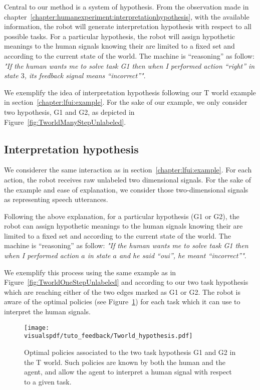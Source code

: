 Central to our method is a system of hypothesis. From the observation made in chapter~\ref{chapter:humanexperiment:interpretationhypothesis}, with the available information, the robot will generate interpretation hypothesis with respect to all possible tasks. For a particular hypothesis, the robot will assign hypothetic meanings to the human signals knowing their are limited to a fixed set and according to the current state of the world. The machine is ``reasoning'' as follow: \emph{"If the human wants me to solve task G1 then when I performed action ``right'' in state $3$, its feedback signal means ``incorrect''"}. 

We exemplify the idea of interpretation hypothesis following our T world example in section~\ref{chapter:lfui:example}. For the sake of our example, we only consider two hypothesis, G1 and G2, as depicted in Figure~\ref{fig:TworldManyStepUnlabeled}.

\subsection{Interpretation hypothesis}
\label{chapter:lfui:interpreation}

We considerer the same interaction as in section~\ref{chapter:lfui:example}. For each action, the robot receives raw unlabeled two dimensional signals. For the sake of the example and ease of explanation, we consider those two-dimensional signals as representing speech utterances.

Following the above explanation, for a particular hypothesis (G1 or G2), the robot can assign hypothetic meanings to the human signals knowing their are limited to a fixed set and according to the current state of the world. The machine is ``reasoning'' as follow: \emph{"If the human wants me to solve task G1 then when I performed action $a$ in state $a$ and he said ``oui'', he meant ``incorrect''"}. 

We exemplify this process using the same example as in Figure~\ref{fig:TworldOneStepUnlabeled} and according to our two task hypothesis which are reaching either of the two edges marked as G1 or G2. The robot is aware of the optimal policies (see Figure~\ref{fig:Twolrdpolicies}) for each task which it can use to interpret the human signals.

\begin{figure}[!ht]
  \centering
  \texttt{[image: \\visualspdf/tuto\_feedback/Tworld\_hypothesis.pdf]}
  \caption{Optimal policies associated to the two task hypothesis G1 and G2 in the T world. Such policies are known by both the human and the agent, and allow the agent to interpret a human signal with respect to a given task.}
  \label{fig:Twolrdpolicies}
\end{figure}

